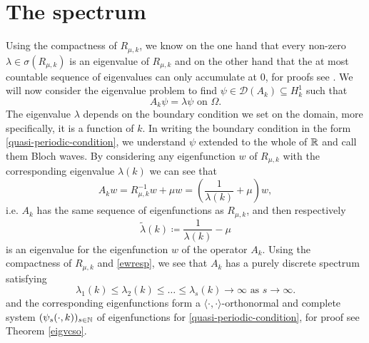 \section{The spectrum} \label{sec:4.3}
Using the compactness of $R_{\mu, k}$, we know on the one hand that every non-zero $\lambda \in \sigma(R_{\mu, k})$ is an eigenvalue of $R_{\mu, k}$ and on the other hand that the at most countable sequence of eigenvalues can only accumulate at $0$, for proofs see \cite[p. 271]{werner2006funkana}. We will now consider the eigenvalue problem to find $\psi \in \mathcal{D}(A_{k}) \subseteq H_{k}^{1}$ such that
	\begin{equation}
		A_{k} \psi = \lambda \psi \text{ on } \Omega. \label{eigv-problem}
	\end{equation}
The eigenvalue $\lambda$ depends on the boundary condition we set on the domain, more specifically, it is a function of $k$. In writing the boundary condition in the form \eqref{quasi-periodic-condition}, we understand $\psi$ extended to the whole of $\mathbb{R}$ and call them Bloch waves. By considering any eigenfunction $w$ of $R_{\mu, k}$ with the corresponding eigenvalue $\lambda(k)$ we can see that
	\[ A_{k} w = R_{\mu, k}^{-1} w + \mu w = \left(\frac{1}{\lambda(k)} + \mu\right) w, \]
	i.e. $A_{k}$ has the same sequence of eigenfunctions as $R_{\mu, k}$, and then respectively
	\begin{equation}
		\tilde{\lambda}(k) \coloneqq \frac{1}{\lambda(k)} - \mu \label{ewresp}
	\end{equation} 
is an eigenvalue for the eigenfunction $w$ of the operator $A_{k}$. Using the compactness of $R_{\mu, k}$ and \eqref{ewresp}, we see that $A_{k}$ has a purely discrete spectrum satisfying
	\begin{equation}
		\lambda_{1}(k) \leq \lambda_{2}(k) \leq \dotsc \leq \lambda_{s}(k) \rightarrow \infty \text{ as } s \rightarrow \infty. \label{comment-after}
	\end{equation} 
and the corresponding eigenfunctions form a $\langle \cdot , \cdot \rangle$-orthonormal and complete system $(\psi_{s}(\cdot, k))_{s \in \mathbb{N}}$ of eigenfunctions for \eqref{quasi-periodic-condition}, for proof see Theorem \ref{eigvcso}.
~\\

